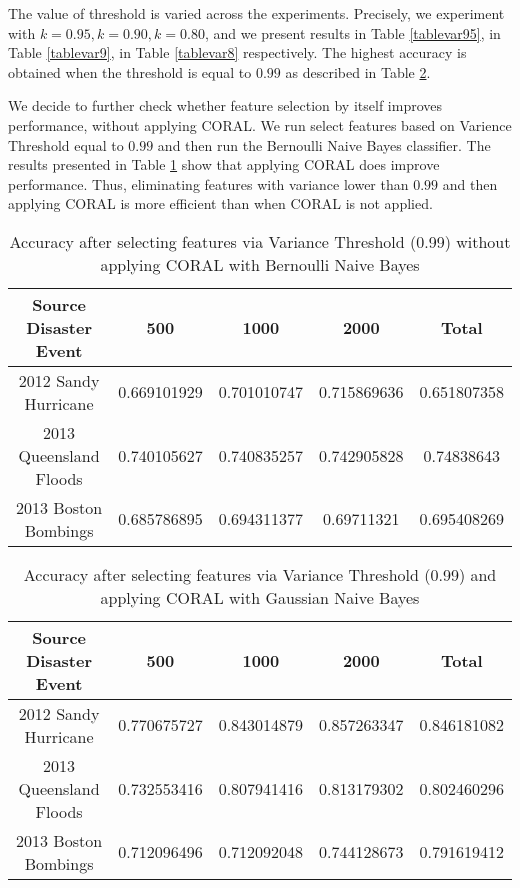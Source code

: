 The value of threshold is varied across the experiments. Precisely, we experiment with $k=0.95, k=0.90, k=0.80$, and we present results in Table \ref{tablevar95}, in Table \ref{tablevar9}, in Table \ref{tablevar8} respectively. The highest accuracy is obtained when the threshold is equal to $0.99$ as described in Table \ref{tablevar99}. 

We decide to further check whether feature selection by itself improves performance, without applying CORAL. We run select features based on Varience Threshold equal to $0.99$ and then run the Bernoulli Naive Bayes classifier. The results presented in Table \ref{tablevar99nocoral} show that applying CORAL does improve performance. Thus, eliminating features with variance lower than $0.99$ and then applying CORAL is more efficient than when CORAL is not applied. 

\begin{table}[ht]
    \begin{center}
    \caption{Accuracy after selecting features via Variance Threshold (0.99) without applying CORAL with Bernoulli Naive Bayes}
    \begin{tabular}[c]{|c|c|c|c|c|}
        \hline
        Source Disaster Event & 500 & 1000 & 2000 & Total \\
        \hline
        2012 Sandy Hurricane & 0.669101929 & 0.701010747 & 0.715869636 & 0.651807358 \\
        2013 Queensland Floods & 0.740105627 & 0.740835257 & 0.742905828 & 0.74838643 \\
        2013 Boston Bombings & 0.685786895 & 0.694311377 & 0.69711321 & 0.695408269 \\
        \hline
    \end{tabular}
    \label{tablevar99nocoral}
   \end{center}
\end{table}


\begin{table}[ht]
    \begin{center}
    \caption{Accuracy after selecting features via Variance Threshold (0.99) and applying CORAL with Gaussian Naive Bayes}
    \begin{tabular}[c]{|c|c|c|c|c|}
        \hline
        Source Disaster Event & 500 & 1000 & 2000 & Total \\
        \hline
        2012 Sandy Hurricane & 0.770675727 & 0.843014879 & 0.857263347 & 0.846181082 \\
        2013 Queensland Floods & 0.732553416 & 0.807941416 & 0.813179302 & 0.802460296 \\
        2013 Boston Bombings & 0.712096496 & 0.712092048 & 0.744128673 & 0.791619412 \\
        \hline
    \end{tabular}
    \label{tablevar99}
   \end{center}
\end{table}



